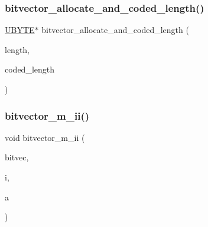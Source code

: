 \mbox{\label{util_8_c_a71c00a15bba415dad4d3db0efbacc79d}} 
\subsubsection{\texorpdfstring{bitvector\+\_\+allocate\+\_\+and\+\_\+coded\+\_\+length()}{bitvector\_allocate\_and\_coded\_length()}}
{\footnotesize\ttfamily \mbox{\hyperlink{galois_8h_a122c4acf389c050379f00341fdcd5812}{U\+B\+Y\+TE}}$\ast$ bitvector\+\_\+allocate\+\_\+and\+\_\+coded\+\_\+length (\begin{DoxyParamCaption}\item[{\mbox{\hyperlink{galois_8h_a09fddde158a3a20bd2dcadb609de11dc}{I\+NT}}}]{length,  }\item[{\mbox{\hyperlink{galois_8h_a09fddde158a3a20bd2dcadb609de11dc}{I\+NT}} \&}]{coded\+\_\+length }\end{DoxyParamCaption})}

\mbox{\label{util_8_c_a31da55e2b26316d582cd322dc670b67b}} 
\subsubsection{\texorpdfstring{bitvector\+\_\+m\+\_\+ii()}{bitvector\_m\_ii()}}
{\footnotesize\ttfamily void bitvector\+\_\+m\+\_\+ii (\begin{DoxyParamCaption}\item[{\mbox{\hyperlink{galois_8h_a122c4acf389c050379f00341fdcd5812}{U\+B\+Y\+TE}} $\ast$}]{bitvec,  }\item[{\mbox{\hyperlink{galois_8h_a09fddde158a3a20bd2dcadb609de11dc}{I\+NT}}}]{i,  }\item[{\mbox{\hyperlink{galois_8h_a09fddde158a3a20bd2dcadb609de11dc}{I\+NT}}}]{a }\end{DoxyParamCaption})}

\mbox{\label{util_8_c_ac0135a3681a44df3fe7af1545676fbe2}} 
